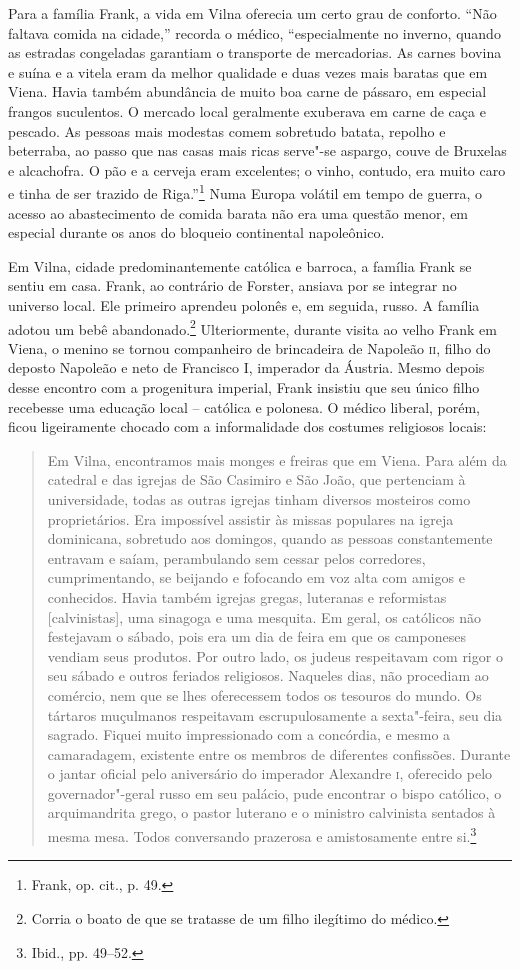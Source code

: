 Para a família Frank, a vida em Vilna oferecia um certo grau de
conforto. ``Não faltava comida na cidade,'' recorda o médico,
``especialmente no inverno, quando as estradas congeladas garantiam o
transporte de mercadorias. As carnes bovina e suína e a vitela eram da
melhor qualidade e duas vezes mais baratas que em Viena. Havia também
abundância de muito boa carne de pássaro, em especial frangos
suculentos. O mercado local geralmente exuberava em carne de caça e
pescado. As pessoas mais modestas comem sobretudo batata, repolho e
beterraba, ao passo que nas casas mais ricas serve"-se aspargo, couve de
Bruxelas e alcachofra. O pão e a cerveja eram excelentes; o vinho,
contudo, era muito caro e tinha de ser trazido de Riga.''\footnote{Frank, op. cit., p. 49.} Numa Europa volátil em tempo de guerra, o acesso ao abastecimento de comida barata não era uma questão menor, em especial
durante os anos do bloqueio continental napoleônico.

Em Vilna, cidade predominantemente católica e barroca, a família Frank
se sentiu em casa. Frank, ao contrário de Forster, ansiava por se
integrar no universo local. Ele primeiro aprendeu polonês e, em seguida,
russo. A família adotou um bebê abandonado.\footnote{Corria o boato de que se
tratasse de um filho ilegítimo do médico.} Ulteriormente, durante visita
ao velho Frank em Viena, o menino se tornou companheiro de brincadeira
de Napoleão \textsc{ii}, filho do deposto Napoleão e neto de Francisco I,
imperador da Áustria. Mesmo depois desse encontro com a progenitura
imperial, Frank insistiu que seu único filho recebesse uma educação
local -- católica e polonesa. O médico liberal, porém, ficou ligeiramente
chocado com a informalidade dos costumes religiosos locais:

\begin{quote}
Em Vilna, encontramos mais monges e freiras que em Viena. Para além da
catedral e das igrejas de São Casimiro e São João, que pertenciam à
universidade, todas as outras igrejas tinham diversos mosteiros como
proprietários. Era impossível assistir às missas populares na igreja
dominicana, sobretudo aos domingos, quando as pessoas constantemente
entravam e saíam, perambulando sem cessar pelos corredores,
cumprimentando, se beijando e fofocando em voz alta com amigos e
conhecidos. Havia também igrejas gregas, luteranas e reformistas
{[}calvinistas{]}, uma sinagoga e uma mesquita. Em geral, os católicos
não festejavam o sábado, pois era um dia de feira em que os camponeses
vendiam seus produtos. Por outro lado, os judeus respeitavam com rigor o
seu sábado e outros feriados religiosos. Naqueles dias, não procediam ao
comércio, nem que se lhes oferecessem todos os tesouros do mundo. Os
tártaros muçulmanos respeitavam escrupulosamente a sexta"-feira, seu dia
sagrado. Fiquei muito impressionado com a concórdia, e mesmo a
camaradagem, existente entre os membros de diferentes confissões.
Durante o jantar oficial pelo aniversário do imperador Alexandre
\textsc{i}, oferecido pelo governador"-geral russo em seu palácio, pude
encontrar o bispo católico, o arquimandrita grego, o pastor luterano e o
ministro calvinista sentados à mesma mesa. Todos conversando prazerosa e
amistosamente entre si.\footnote{Ibid., pp. 49--52.}
\end{quote}

